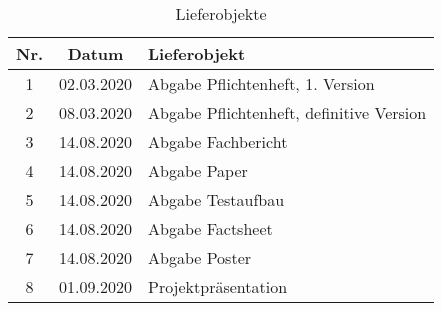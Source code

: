 \begin{table}[H]
     \centering
\begin{tabular}{|c|c|l|}\hline
   \textbf{Nr.} & \textbf{Datum} & \textbf{Lieferobjekt} \\ \hline
   
   1 & 02.03.2020 & Abgabe Pflichtenheft, 1. Version\\ \hline
   2 & 08.03.2020 & Abgabe Pflichtenheft, definitive Version\\ \hline
   3 & 14.08.2020 & Abgabe Fachbericht \\ \hline
   4 & 14.08.2020 & Abgabe Paper \\ \hline
   5 & 14.08.2020 & Abgabe Testaufbau \\ \hline
   6 & 14.08.2020 & Abgabe Factsheet \\ \hline
   7 & 14.08.2020 & Abgabe Poster \\ \hline
   8 & 01.09.2020 & Projektpräsentation \\ \hline
   
 \end{tabular}
     \caption{Lieferobjekte}
     \label{tbl:Lieferobjekte}
\end{table}